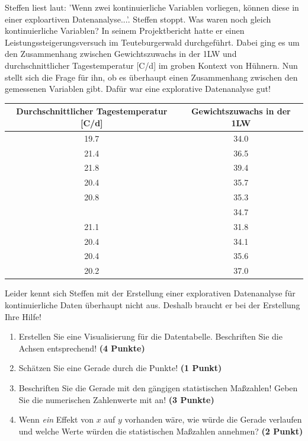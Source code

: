 \documentclass[a4paper, 9pt]{scrartcl}\usepackage[]{graphicx}\usepackage[]{xcolor}
\begin{document}
Steffen liest laut: 'Wenn zwei kontinuierliche Variablen vorliegen, können diese in einer exploartiven Datenanalyse...'. Steffen stoppt. Was waren noch gleich kontinuierliche Variablen? In seinem Projektbericht hatte er einen Leistungssteigerungsversuch im Teuteburgerwald durchgeführt. Dabei ging es um den Zusammenhang zwischen Gewichtszuwachs in der 1LW und durchschnittlicher Tagestemperatur [C/d] im groben Kontext von Hühnern. Nun stellt sich die Frage für ihn, ob es überhaupt einen Zusammenhang zwischen den gemessenen Variablen gibt. Dafür war eine explorative Datenanalyse gut!

\begin{table}[!h]
\centering
\begin{tabular}{cc}
\toprule
Durchschnittlicher Tagestemperatur [C/d] & Gewichtszuwachs in der 1LW\\
\midrule
19.7 & 34.0\\
21.4 & 36.5\\
21.8 & 39.4\\
20.4 & 35.7\\
20.8 & 35.3\\
\addlinespace
19.1 & 34.7\\
21.1 & 31.8\\
20.4 & 34.1\\
20.4 & 35.6\\
20.2 & 37.0\\
\bottomrule
\end{tabular}
\end{table}



Leider kennt sich Steffen mit der Erstellung einer explorativen Datenanalyse für kontinuierliche Daten überhaupt nicht aus. Deshalb braucht er bei der Erstellung Ihre Hilfe!

\begin{enumerate}
\item Erstellen Sie eine Visualisierung für die Datentabelle. Beschriften Sie
  die Achsen entsprechend! \textbf{(4 Punkte)}
\item Schätzen Sie eine Gerade durch die Punkte! \textbf{(1 Punkt)}
\item Beschriften Sie die Gerade mit den gängigen statistischen Maßzahlen! Geben Sie die numerischen Zahlenwerte mit an! \textbf{(3 Punkte)}
\item Wenn \textit{ein} Effekt von $x$ auf $y$ vorhanden wäre, wie würde die Gerade verlaufen und welche Werte würden die statistischen Maßzahlen annehmen? \textbf{(2 Punkt)}
\end{enumerate} 
\clearpage
\end{document}
